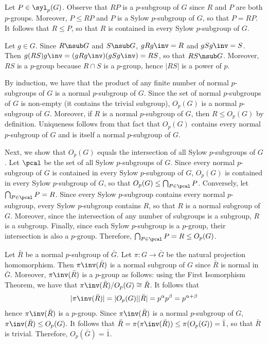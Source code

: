 \begin{solenum}
	\item Let $P \in \syl_p(G)$.
	Observe that $RP$ is a $p$-subgroup of $G$ since $R$ and $P$ are both $p$-groups.
	Moreover, $P \leq RP$ and $P$ is a Sylow $p$-subgroup of $G$, so that $P = RP$.
	It follows that $R \leq P$, so that $R$ is contained in every Sylow $p$-subgroup of $G$.
	\item Let $g \in G$.
	Since $R \nsub G$ and $S \nsub G$, $gRg\inv = R$ and $gSg\inv = S$.
	Then $g(RS)g\inv = (gRg\inv)(gSg\inv) = RS$, so that $RS \nsub G$.
	Moreover, $RS$ is a $p$-group because $R \cap S$ is a $p$-group, hence $|RS|$ is a power of $p$.
	\item By induction, we have that the product of any finite number of normal $p$-subgroups of $G$ is a normal $p$-subgroup of $G$.
	Since the set of normal $p$-subgroups of $G$ is non-empty (it contains the trivial subgroup), $O_p(G)$ is a normal $p$-subgroup of $G$.
	Moreover, if $R$ is a normal $p$-subgroup of $G$, then $R \leq O_p(G)$ by definition.
	Uniqueness follows from that fact that $O_p(G)$ contains every normal $p$-subgroup of $G$ and is itself a normal $p$-subgroup of $G$.
	
	Next, we show that $O_p(G)$ equals the intersection of all Sylow $p$-subgroups of $G$.
	Let $\pcal$ be the set of all Sylow $p$-subgroups of $G$.
	Since every normal $p$-subgroup of $G$ is contained in every Sylow $p$-subgroup of $G$, $O_p(G)$ is contained in every Sylow $p$-subgroup of $G$, so that $O_p(G) \leq \bigcap_{P \in \pcal} P$.
	Conversely, let $\bigcap_{P \in \pcal} P = R$.
	Since every Sylow $p$-subgroup contains every normal $p$-subgroup, every Sylow $p$-subgroup contains $R$, so that $R$ is a normal subgroup of $G$.
	Moreover, since the intersection of any number of subgroups is a subgroup, $R$ is a subgroup.
	Finally, since each Sylow $p$-subgroup is a $p$-group, their intersection is also a $p$-group.
	Therefore, $\bigcap_{P \in \pcal} P = R \leq O_p(G)$.
	\item Let $\bar R$ be a normal $p$-subgroup of $\bar G$.
	Let $\pi : G \to \bar G$ be the natural projection homomorphism.
	Then $\pi\inv(\bar R)$ is a normal subgroup of $G$ since $\bar R$ is normal in $\bar G$.
	Moreover, $\pi\inv(\bar R)$ is a $p$-group as follows: using the First Isomorphism Theorem, we have that $\pi\inv(\bar R)/O_p(G) \cong \bar R$.
	It follows that
	\[
		|\pi\inv(\bar R)| = |O_p(G)||\bar R| = p^\alpha p^\beta = p^{\alpha + \beta}
	\]
	hence $\pi\inv(\bar R)$ is a $p$-group.
	Since $\pi\inv(\bar R)$ is a normal $p$-subgroup of $G$, $\pi\inv(\bar R) \leq O_p(G)$.
	It follows that $\bar R = \pi(\pi\inv(\bar R)) \leq \pi(O_p(G)) = \bar 1$, so that $\bar R$ is trivial.
	Therefore, $O_p(\bar G) = \bar 1$.
\end{solenum}

